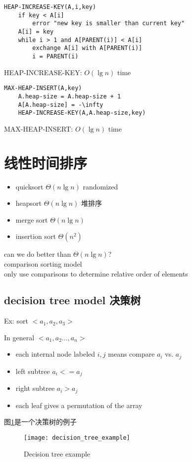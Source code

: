 \documentclass{article}
\begin{document}
\begin{verbatim}
HEAP-INCREASE-KEY(A,i,key)
    if key < A[i]
        error "new key is smaller than current key"
    A[i] = key
    while i > 1 and A[PARENT(i)] < A[i]
        exchange A[i] with A[PARENT(i)]
        i = PARENT(i)
\end{verbatim}
HEAP-INCREASE-KEY: $O(\lg n )$ time

\begin{verbatim}
MAX-HEAP-INSERT(A,key)
    A.heap-size = A.heap-size + 1
    A[A.heap-size] = -\infty
    HEAP-INCREASE-KEY(A,A.heap-size,key)
\end{verbatim}
MAX-HEAP-INSERT: $O(\lg n )$ time

\section{线性时间排序}
\begin{itemize}
\item quicksort $\Theta(n\lg n )$  randomized
\item heapsort $\Theta(n\lg n )$ 堆排序
\item merge sort $\Theta(n\lg n )$
\item insertion sort $\Theta(n^2)$
\end{itemize}

can we do better than $\Theta(n\lg n )$?\\
comparison sorting model\\
only use comparisons to determine relative order of elements

\subsection{decision tree model 决策树}
Ex: sort $<a_1, a_2, a_3>$

In general $<a_1,a_2...,a_n>$
\begin{itemize}
\item each internal node labeled $i, j$ means compare $a_i$ vs. $a_j$
\item left subtree $a_i <= a_j$
\item right subtree $a_i > a_j$
\item each leaf gives a permutation of the array
\end{itemize}

图\ref{fig.decision_tree.example}是一个决策树的例子
\begin{figure}[htbp]
  \centering
  \texttt{[image: decision\_tree\_example]}\\
  \caption{Decision tree example}\label{fig.decision_tree.example}
\end{figure}
\end{document}
